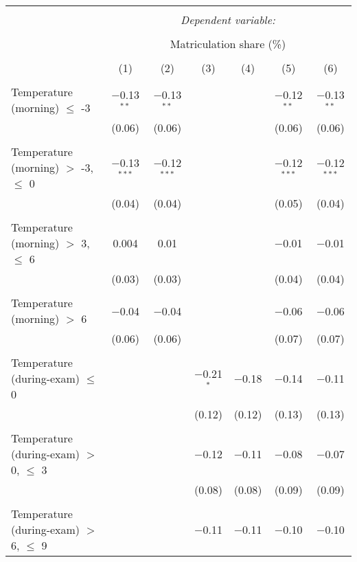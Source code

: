 
\begin{tabular}{@{\extracolsep{5pt}}lcccccc} 
\\[-1.8ex]\hline 
\hline \\[-1.8ex] 
 & \multicolumn{6}{c}{\textit{Dependent variable:}} \\ 
\cline{2-7} 
\\[-1.8ex] & \multicolumn{6}{c}{Matriculation share (\%)} \\ 
\\[-1.8ex] & (1) & (2) & (3) & (4) & (5) & (6)\\ 
\hline \\[-1.8ex] 
 Temperature (morning) $\le$ -3 & $-$0.13$^{**}$ & $-$0.13$^{**}$ &  &  & $-$0.12$^{**}$ & $-$0.13$^{**}$ \\ 
  & (0.06) & (0.06) &  &  & (0.06) & (0.06) \\ 
  & & & & & & \\ 
 Temperature (morning) $>$ -3, $\le$ 0 & $-$0.13$^{***}$ & $-$0.12$^{***}$ &  &  & $-$0.12$^{***}$ & $-$0.12$^{***}$ \\ 
  & (0.04) & (0.04) &  &  & (0.05) & (0.04) \\ 
  & & & & & & \\ 
 Temperature (morning) $>$ 3, $\le$ 6 & 0.004 & 0.01 &  &  & $-$0.01 & $-$0.01 \\ 
  & (0.03) & (0.03) &  &  & (0.04) & (0.04) \\ 
  & & & & & & \\ 
 Temperature (morning) $>$ 6 & $-$0.04 & $-$0.04 &  &  & $-$0.06 & $-$0.06 \\ 
  & (0.06) & (0.06) &  &  & (0.07) & (0.07) \\ 
  & & & & & & \\ 
 Temperature (during-exam) $\le$ 0 &  &  & $-$0.21$^{*}$ & $-$0.18 & $-$0.14 & $-$0.11 \\ 
  &  &  & (0.12) & (0.12) & (0.13) & (0.13) \\ 
  & & & & & & \\ 
 Temperature (during-exam) $>$ 0, $\le$ 3 &  &  & $-$0.12 & $-$0.11 & $-$0.08 & $-$0.07 \\ 
  &  &  & (0.08) & (0.08) & (0.09) & (0.09) \\ 
  & & & & & & \\ 
 Temperature (during-exam) $>$ 6, $\le$ 9 &  &  & $-$0.11 & $-$0.11 & $-$0.10 & $-$0.10 \\ 

\end{tabular}
